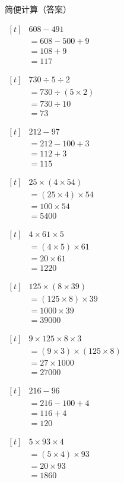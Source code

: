 \documentclass[UTF8]{ctexart}
\newcommand{\sheettitle}[1]{%
  \begin{center}
    {\zihao{1} #1\par}
  \end{center}
  \vspace{8mm}%
}
\newcommand{\cell}[1]{%
  \begin{minipage}[t][49mm][t]{0.315\textwidth}%
    \vspace{0pt}%
    \linespread{1}\zihao{3}%
    #1%
  \end{minipage}%
}
\newcommand{\sheetrow}[3]{%
  \noindent\cell{#1}\hfill\cell{#2}\hfill\cell{#3}\par
  \nointerlineskip
}
\begin{document}
\sheettitle{简便计算（答案）}
\sheetrow
{\(\begin{aligned}[t]
& 608-491 \\
& = 608-500+9 \\
& = 108+9 \\
& = 117
\end{aligned}\)}
{\(\begin{aligned}[t]
& 730\div 5\div 2 \\
& = 730\div (5\times 2) \\
& = 730\div 10 \\
& = 73
\end{aligned}\)}
{\(\begin{aligned}[t]
& 212-97 \\
& = 212-100+3 \\
& = 112+3 \\
& = 115
\end{aligned}\)}
\sheetrow
{\(\begin{aligned}[t]
& 25\times (4\times 54) \\
& = (25\times 4)\times 54 \\
& = 100\times 54 \\
& = 5400
\end{aligned}\)}
{\(\begin{aligned}[t]
& 4\times 61\times 5 \\
& = (4\times 5)\times 61 \\
& = 20\times 61 \\
& = 1220
\end{aligned}\)}
{\(\begin{aligned}[t]
& 125\times (8\times 39) \\
& = (125\times 8)\times 39 \\
& = 1000\times 39 \\
& = 39000
\end{aligned}\)}
\sheetrow
{\(\begin{aligned}[t]
& 9\times 125\times 8\times 3 \\
& = (9\times 3)\times (125\times 8) \\
& = 27\times 1000 \\
& = 27000
\end{aligned}\)}
{\(\begin{aligned}[t]
& 216-96 \\
& = 216-100+4 \\
& = 116+4 \\
& = 120
\end{aligned}\)}
{\(\begin{aligned}[t]
& 5\times 93\times 4 \\
& = (5\times 4)\times 93 \\
& = 20\times 93 \\
& = 1860
\end{aligned}\)}
\end{document}
